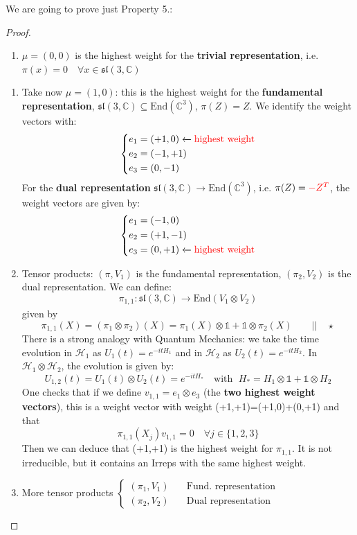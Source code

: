 \documentclass[../main.tex]{subfiles}
\begin{document}
We are going to prove just Property 5.:
\begin{proof}
\renewcommand{\labelenumi}{0.}
\begin{enumerate}
    \item  $\mu=(0,0)$ is the highest weight for the \textbf{trivial representation}, i.e. $\pi(x)=0 \quad \forall x\in\mathfrak{sl}(3,\mathbb{C})$
\end{enumerate}
\renewcommand{\labelenumi}{\arabic{enumi}.}
\begin{enumerate}
    \item Take now $\mu=(1,0)$: this is the highest weight for the \textbf{fundamental representation}, $\mathfrak{sl}(3,\mathbb{C})\subseteq\textrm{End}(\mathbb{C}^3)$, $\pi(Z)=Z$. We identify the weight vectors with:
\[
\left\{
\begin{aligned}
e_1&=(+1,0)\xleftarrow[]{}{\color{red}\text{highest weight}}\\
e_2&=(-1,+1)\\
e_3&=(0,-1)
\end{aligned}
\right.
\]
For the \textbf{dual representation} $\mathfrak{sl}(3,\mathbb{C})\to\textrm{End}(\mathbb{C}^3)$, i.e. $\pi(Z)={\color{red}-Z^T}$, the weight vectors are given by:
\[
\left\{
\begin{aligned}
e_1&=(-1,0)\\
e_2&=(+1,-1)\\
e_3&=(0,+1)\xleftarrow[]{}{\color{red}\text{highest weight}}
\end{aligned}
\right.
\]
\item Tensor products: $(\pi,V_1)$ is the fundamental representation, $(\pi_2,V_2)$ is the dual representation. We can define:
\[
\pi_{1,1}:\mathfrak{sl}(3,\mathbb{C})\xrightarrow[]{}\text{End}(V_1\otimes V_2)
\]
given by
\[
\pi_{1,1}(X)=(\pi_1\otimes\pi_2)(X)=\pi_1(X)\otimes\mathbb{1}+\mathbb{1}\otimes\pi_2(X) \qquad \Big|\Big|\quad \star
\]
There is a strong analogy with Quantum Mechanics: we take the time evolution in $\mathcal{H}_1$ as $U_1(t)=e^{-itH_1}$ and in $\mathcal{H}_2$ as $U_2(t)=e^{-itH_2}$. In $\mathcal{H}_1\otimes\mathcal{H}_2$, the evolution is given by:
\[
U_{1,2}(t)=U_1(t)\otimes U_2(t)=e^{-itH_*} \quad \textrm{with }\; H_*=H_1\otimes\mathbb{1}+\mathbb{1}\otimes H_2
\]
One checks that if we define $v_{1,1}=e_1\otimes e_3$ (the \textbf{two highest weight vectors}), this is a weight vector with weight (+1,+1)=(+1,0)+(0,+1) and that
\[
\pi_{1,1}(X_j)v_{1,1}=0 \quad \forall j\in\{1,2,3\}
\]
Then we can deduce that (+1,+1) is the highest weight for $\pi_{1,1}$. It is not irreducible, but it contains an Irreps with the same highest weight.
\item More tensor products $\begin{cases}
    (\pi_1,V_1) \quad &\textrm{Fund. representation}\\
    (\pi_2,V_2) \quad &\textrm{Dual representation}
\end{cases}$ 


\end{enumerate}
\end{proof}
\end{document}
